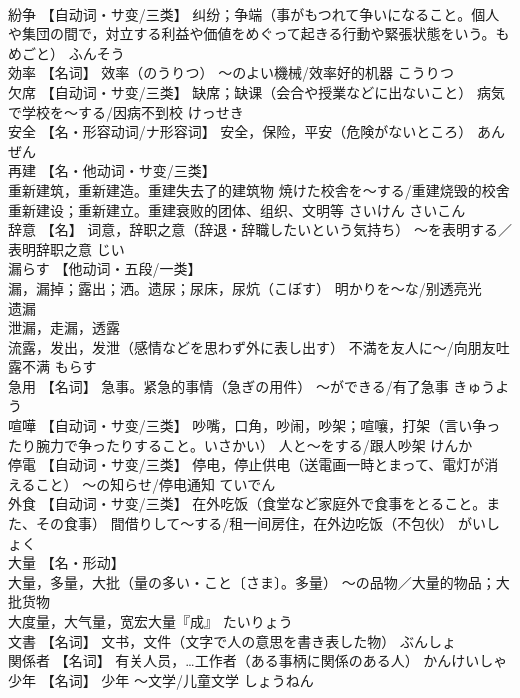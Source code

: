 \documentclass[8pt]{extreport}
\begin{document}
\begin{CJK}{UTF8}{min}
\\	紛争	【自动词・サ变/三类】 纠纷；争端（事がもつれて争いになること。個人や集団の間で，対立する利益や価値をめぐって起きる行動や緊張状態をいう。もめごと）	ふんそう	
\\	効率	【名词】 效率（のうりつ） ～のよい機械/效率好的机器	こうりつ	
\\	欠席	【自动词・サ变/三类】 缺席；缺课（会合や授業などに出ないこと） 病気で学校を～する/因病不到校	けっせき	
\\	安全	【名・形容动词/ナ形容词】 安全，保险，平安（危険がないところ）	あんぜん	
\\	再建	【名・他动词・サ变/三类】 
\\	重新建筑，重新建造。重建失去了的建筑物 焼けた校舎を～する/重建烧毁的校舍 
\\	重新建设；重新建立。重建衰败的团体、组织、文明等	さいけん さいこん	
\\	辞意	【名】 词意，辞职之意（辞退・辞職したいという気持ち） ～を表明する／表明辞职之意	じい	
\\	漏らす	【他动词・五段/一类】 
\\	漏，漏掉；露出；洒。遗尿；尿床，尿炕（こぼす） 明かりを～な/别透亮光 
\\	遗漏 
\\	泄漏，走漏，透露 
\\	流露，发出，发泄（感情などを思わず外に表し出す） 不満を友人に～/向朋友吐露不满	もらす	
\\	急用	【名词】 急事。紧急的事情（急ぎの用件） ～ができる/有了急事	きゅうよう	
\\	喧嘩	【自动词・サ变/三类】 吵嘴，口角，吵闹，吵架；喧嚷，打架（言い争ったり腕力で争ったりすること。いさかい） 人と～をする/跟人吵架	けんか	
\\	停電	【自动词・サ变/三类】 停电，停止供电（送電画一時とまって、電灯が消えること） ～の知らせ/停电通知	ていでん	
\\	外食	【自动词・サ变/三类】 在外吃饭（食堂など家庭外で食事をとること。また、その食事） 間借りして～する/租一间房住，在外边吃饭（不包伙）	がいしょく	
\\	大量	【名・形动】 
\\	大量，多量，大批（量の多い・こと〔さま〕。多量） ～の品物／大量的物品；大批货物 
\\	大度量，大气量，宽宏大量『成』	たいりょう	
\\	文書	【名词】 文书，文件（文字で人の意思を書き表した物）	ぶんしょ	
\\	関係者	【名词】 有关人员，…工作者（ある事柄に関係のある人）	かんけいしゃ	
\\	少年	【名词】 少年 ～文学/儿童文学	しょうねん	

\end{CJK}
\end{document}

